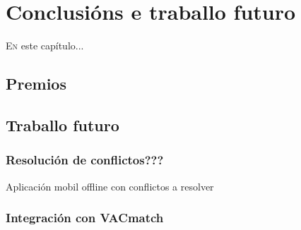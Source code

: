 \chapter{Conclusións e traballo futuro}
\minitoc


  \lettrine{E}{n} este capítulo...

\section{Premios}

\section{Traballo futuro}

  \subsection{Resolución de conflictos???}
  Aplicación mobil offline con conflictos a resolver

  \subsection{Integración con VACmatch}
